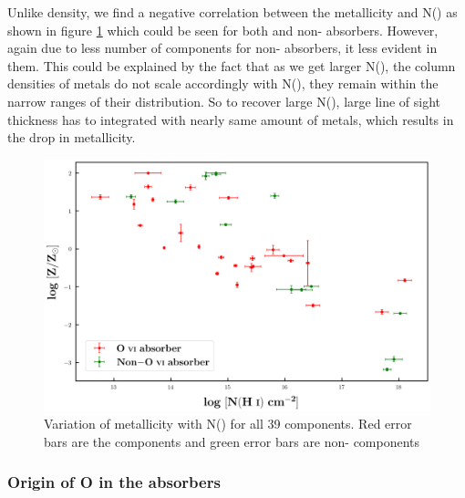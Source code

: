 Unlike density, we find a negative correlation between the metallicity and N() as shown in figure \ref{fig:Z-NHi} which could be seen for both  and non- absorbers. However, again due to less number of components for non- absorbers, it less evident in them. This could be explained by the fact that as we get larger N(), the column densities of metals do not scale accordingly with N(), they remain within the narrow ranges of their distribution. So to recover large N(), large line of sight thickness has to integrated with nearly same amount of metals, which results in the drop in metallicity.


\begin{figure}[!htbp]
    \centering
    \includegraphics[width=0.9\linewidth]{Figures/Z_vs_NHi.png}
    \caption{Variation of metallicity with N() for all 39 components. Red error bars are the  components and green error bars are non- components}
    \label{fig:Z-NHi}
\end{figure}


\subsubsection{Origin of O \hspace*{-0.5mm}{\footnotesize VI} in the absorbers}


